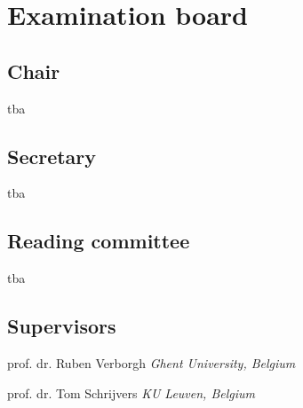\chapter*{Examination board}

\section*{Chair}

tba

\section*{Secretary}

tba

\section*{Reading committee}

tba

\section*{Supervisors}

prof. dr. Ruben Verborgh {\smaller \emph{Ghent University, Belgium}}

prof. dr. Tom Schrijvers {\smaller \emph{KU Leuven, Belgium}}

